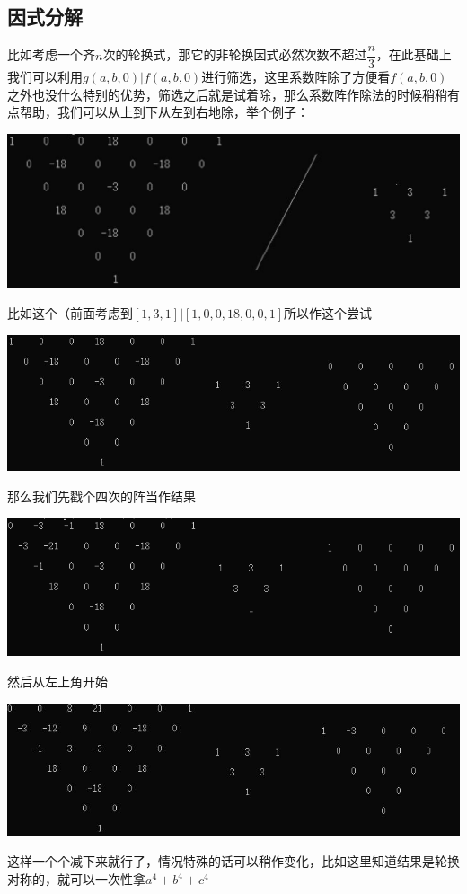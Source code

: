 \documentclass[UTF8]{ctexart}
\begin{document}
\subsection{因式分解}
比如考虑一个齐$ n $次的轮换式，那它的非轮换因式必然次数不超过$ \dfrac{n}{3} $，在此基础上我们可以利用$ g(a,b,0)|f(a,b,0) $进行筛选，这里系数阵除了方便看$ f(a,b,0) $之外也没什么特别的优势，筛选之后就是试着除，那么系数阵作除法的时候稍稍有点帮助，我们可以从上到下从左到右地除，举个例子：
\begin{center}
	\includegraphics[width=0.8\linewidth]{28}
\end{center}
比如这个（前面考虑到$ [1,3,1]|[1,0,0,18,0,0,1] $所以作这个尝试
\begin{center}
	\includegraphics[width=0.5\linewidth]{29}
\end{center}
那么我们先戳个四次的阵当作结果
\begin{center}
	\includegraphics[width=0.8\linewidth]{30}
\end{center}
然后从左上角开始
\begin{center}
	\includegraphics[width=0.8\linewidth]{31}
\end{center}
这样一个个减下来就行了，情况特殊的话可以稍作变化，比如这里知道结果是轮换对称的，就可以一次性拿$ a^4+b^4+c^4 $
\end{document}
